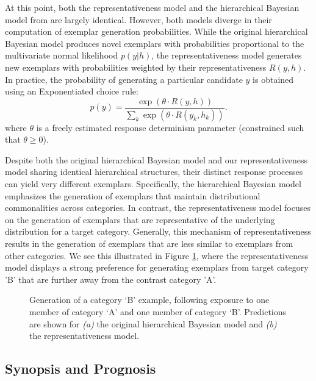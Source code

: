 \documentclass[12pt]{article}
\newcommand\inputpgf[2]{{
\let\pgfimageWithoutPath\pgfimage
\renewcommand{\pgfimage}[2][]{\pgfimageWithoutPath[##1]{#1/##2}}

}}
\begin{document}
\begin{flushleft}
At this point, both the representativeness model and the hierarchical Bayesian
model from \cite{jern2013probabilistic} are largely identical. However, both
models diverge in their computation of exemplar generation probabilities. While
the original hierarchical Bayesian model produces novel exemplars with
probabilities proportional to the multivariate normal likelihood $p(y|h)$, the
representativeness model generates new exemplars with probabilities weighted by
their representativeness $R(y,h)$. In practice, the probability of generating a
particular candidate $y$ is obtained using an Exponentiated
\citet{luce1977choice} choice rule:
\begin{equation}
  p(y) = \dfrac
    {\exp( \theta \cdot R(y,h))}
    {\sum_k \exp(\theta  \cdot R(y_k,h_k))} .
\label{eq:representative-choice}
\end{equation}
where $\theta$ is a freely estimated response determinism parameter (constrained
such that $\theta \geq 0$).

Despite both the original hierarchical Bayesian model and our representativeness
model sharing identical hierarchical structures, their distinct response
processes can yield very different exemplars. Specifically, the hierarchical
Bayesian model emphasizes the generation of exemplars that maintain
distributional commonalities across categories. In contrast, the
representativeness model focuses on the generation of exemplars that are
representative of the underlying distribution for a target category. Generally,
this mechanism of representativeness results in the generation of exemplars that
are less similar to exemplars from other categories. We see this illustrated in
Figure \ref{fig:representative-examples}, where the representativeness model
displays a strong preference for generating exemplars from target category 'B'
that are further away from the contrast category 'A'.

\begin{figure}
	\begin{center} \inputpgf{figs/}{hbm-examples.pgf}
		\caption{Generation of a category `B' example, following exposure
to one member of category `A' and one member of category `B'. Predictions are
shown for {\em(a)} the original hierarchical Bayesian model and {\em(b)} the
representativeness model.}
		\label{fig:representative-examples}
	\end{center}
\end{figure}

\subsection{Synopsis and Prognosis}


\end{flushleft}
\end{document}
